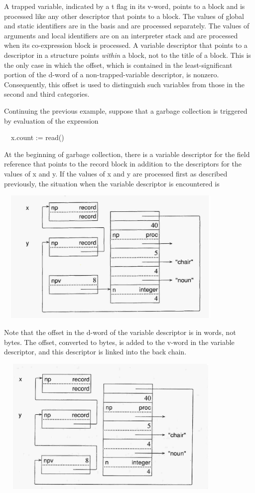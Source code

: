 A trapped variable, indicated by a t flag in its v-word, points to a
block and is processed like any other descriptor that points to a
block. The values of global and static identifiers are in the basis
and are processed separately. The values of arguments and local
identifiers are on an interpreter stack and are processed when its
co-expression block is processed. A variable descriptor that points to
a descriptor in a structure points \textit{within} a block, not to the
title of a block. This is the only case in which the offset, which is
contained in the least-significant portion of the d-word of a
non-trapped-variable descriptor, is nonzero. Consequently, this offset
is used to distinguish such variables from those in the second and
third categories.

Continuing the previous example, suppose that a garbage collection is
triggered by evaluation of the expression

{\ttfamily\mdseries
\ \ x.count := read()}

At the beginning of garbage collection, there is a variable descriptor
for the field reference that points to the record block in addition to
the descriptors for the values of x and y. If the values of x and y
are processed first as described previously, the situation when the
variable descriptor is encountered is

\ \  \includegraphics[width=4.1681in,height=2.5654in]{ib-img/ib-img093.jpg} 

Note that the offset in the d-word of the variable descriptor is in
words, not bytes. The offset, converted to bytes, is added to the
v-word in the variable descriptor, and this descriptor is linked into
the back chain.


\ \  \includegraphics[width=4.1681in,height=2.6217in]{ib-img/ib-img094.jpg} 

